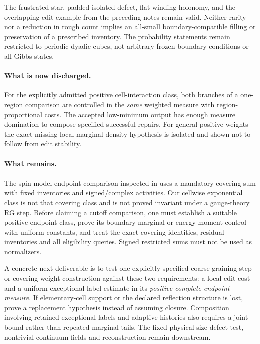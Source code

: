 \documentclass[11pt]{article}
\theoremstyle{definition}
\theoremstyle{remark}
\begin{document}
The frustrated star, padded isolated defect, flat winding holonomy, and
the overlapping-edit example from the preceding notes remain valid.
Neither rarity nor a reduction in rough count implies an all-small
boundary-compatible filling or preservation of a prescribed inventory.
The probability statements remain restricted to periodic dyadic cubes,
not arbitrary frozen boundary conditions or all Gibbs states.

\paragraph{What is now discharged.}
For the explicitly admitted positive cell-interaction class, both branches
of a one-region comparison are controlled in the \emph{same} weighted
measure with region-proportional costs. The accepted low-minimum output
has enough measure domination to compose specified successful repairs.
For general positive weights the exact missing local marginal-density
hypothesis is isolated and shown not to follow from edit stability.

\paragraph{What remains.}
The spin-model endpoint comparison inspected in \cite[\S\textup{Integrated
comparison of endpoint densities}, equations labeled
\texttt{eq:orig-16} and \texttt{eq:orig-22}]{o3} uses a mandatory covering
sum with fixed inventories and signed/complex activities. Our cellwise
exponential class is not that covering class and is not proved invariant
under a gauge-theory RG step. Before claiming a cutoff comparison, one
must establish a suitable positive endpoint class, prove its boundary
marginal or energy-moment control with uniform constants, and treat the
exact covering identities, residual inventories and all eligibility queries.
Signed restricted sums must not be used as normalizers.

A concrete next deliverable is to test one explicitly specified
coarse-graining step or covering-weight construction against these two
requirements: a local edit cost and a uniform exceptional-label estimate
in its \emph{positive complete endpoint measure}. If elementary-cell
support or the declared reflection structure is lost, prove a replacement
hypothesis instead of assuming closure. Composition involving retained
exceptional labels and adaptive histories also requires a joint bound
rather than repeated marginal tails. The fixed-physical-size defect test,
nontrivial continuum fields and reconstruction remain downstream.
\end{document}
